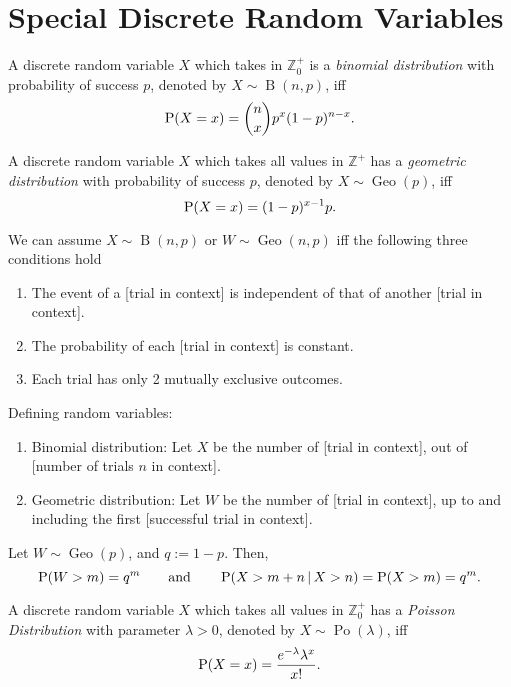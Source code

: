\documentclass[oneside]{book}
\begin{document}
\chapter{Special Discrete Random Variables}
\begin{definition}{}{}
  A discrete random variable \(X\) which takes in \(\mathbb{Z}^{+}_{0}\) is a \emph{binomial distribution} with probability of success \(p\), denoted by \(X \sim \operatorname{B}(n,p)\), iff
  \[\operatorname{P}(X=x)=\binom{n}{x}p^x(1-p)^{n-x}.\]
\end{definition}
\begin{definition}{}{}
  A discrete random variable \(X\) which takes all values in \(\mathbb{Z}^{+}\) has a \emph{geometric distribution} with probability of success \(p\), denoted by \(X \sim \operatorname{Geo}(p)\), iff
  \[\operatorname{P}(X=x)=(1-p)^{x-1}p.\]
\end{definition}
\begin{note}
  We can assume \(X \sim \operatorname{B}(n,p)\) or \(W \sim \operatorname{Geo}(n,p)\) iff the following three conditions hold
  \begin{enumerate}
    \item The event of a [trial in context] is independent of that of another [trial in context].
    \item The probability of each [trial in context] is constant.
    \item Each trial has only 2 mutually exclusive outcomes.
  \end{enumerate}
\end{note}
\begin{note}
  Defining random variables:
  \begin{enumerate}
    \item Binomial distribution: Let \(X\) be the number of [trial in context], out of [number of trials \(n\) in context]. 
    \item Geometric distribution: Let \(W\) be the number of [trial in context], up to and including the first [successful trial in context].
  \end{enumerate}
\end{note}
\begin{note}
  Let \(W \sim \operatorname{Geo}(p)\), and \(q:=1-p\). Then, 
  \[\operatorname{P}(W>m)=q^m \qquad\text{and}\qquad \operatorname{P}(X>m+n \,\vert\, X>n)=\operatorname{P}(X>m)=q^m.\]
\end{note}
\begin{definition}{}{}
  A discrete random variable \(X\) which takes all values in \(\mathbb{Z}_{0}^{+}\) has a \emph{Poisson Distribution} with parameter \(\lambda>0\), denoted by \(X \sim \operatorname{Po}(\lambda)\), iff 
  \[\operatorname{P}(X=x)=\frac{e^{-\lambda}\lambda^x}{x!}.\]
\end{definition}
\end{document}
